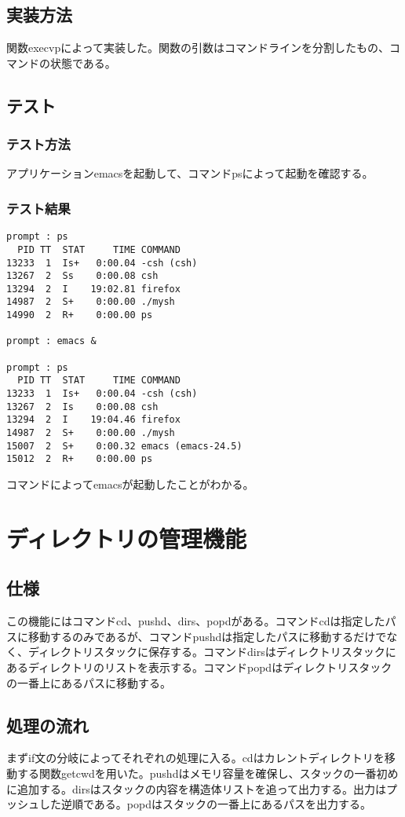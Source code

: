 \documentclass{procreport}
\begin{document}
\subsection{実装方法}
関数execvpによって実装した。関数の引数はコマンドラインを分割したもの、コマンドの状態である。

\subsection{テスト}
\subsubsection{テスト方法}
アプリケーションemacsを起動して、コマンドpsによって起動を確認する。
\subsubsection{テスト結果}
\begin{screen}
\begin{verbatim}
prompt : ps
  PID TT  STAT     TIME COMMAND
13233  1  Is+   0:00.04 -csh (csh)
13267  2  Ss    0:00.08 csh
13294  2  I    19:02.81 firefox
14987  2  S+    0:00.00 ./mysh
14990  2  R+    0:00.00 ps

prompt : emacs &

prompt : ps
  PID TT  STAT     TIME COMMAND
13233  1  Is+   0:00.04 -csh (csh)
13267  2  Is    0:00.08 csh
13294  2  I    19:04.46 firefox
14987  2  S+    0:00.00 ./mysh
15007  2  S+    0:00.32 emacs (emacs-24.5)
15012  2  R+    0:00.00 ps

\end{verbatim}
\end{screen}
コマンドによってemacsが起動したことがわかる。

\section{ディレクトリの管理機能}

\subsection{仕様}
この機能にはコマンドcd、pushd、dirs、popdがある。コマンドcdは指定したパスに移動するのみであるが、コマンドpushdは指定したパスに移動するだけでなく、ディレクトリスタックに保存する。コマンドdirsはディレクトリスタックにあるディレクトリのリストを表示する。コマンドpopdはディレクトリスタックの一番上にあるパスに移動する。

\subsection{処理の流れ}
まずif文の分岐によってそれぞれの処理に入る。cdはカレントディレクトリを移動する関数getcwdを用いた。pushdはメモリ容量を確保し、スタックの一番初めに追加する。dirsはスタックの内容を構造体リストを追って出力する。出力はプッシュした逆順である。popdはスタックの一番上にあるパスを出力する。
\end{document}
